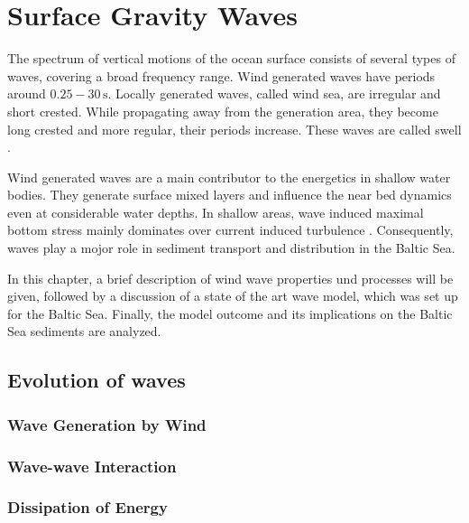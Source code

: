 \chapter{Surface Gravity Waves}
\label{kap-waves}
The spectrum of vertical motions of the ocean surface consists of several types 
of waves, covering a broad frequency range.  Wind generated 
waves have periods around $0.25 - 30\,\text{s}$. Locally generated waves, called 
wind sea, are irregular and short crested. While propagating away from the 
generation area, they become long crested and more regular, their periods 
increase. These waves are called swell \citep[][]{holthuijsen2007}. 

Wind generated waves are a main contributor to the energetics in shallow water 
bodies. They generate surface mixed layers and influence the near bed dynamics 
even at considerable water depths. In shallow areas, wave induced maximal 
bottom stress mainly dominates over current induced turbulence 
\citep[][]{jonsson2004}. Consequently, waves play a 
mojor role in sediment transport and distribution in the Baltic Sea.

In this chapter, a brief description of wind wave properties und processes will 
be given, followed by a discussion of a state of the art wave model, which was 
set up for the Baltic Sea. Finally, the model outcome and its implications on 
the Baltic Sea sediments are analyzed.

\section{Evolution of waves}

\subsection{Wave Generation by Wind}

\subsection{Wave-wave Interaction}

\subsection{Dissipation of Energy}

